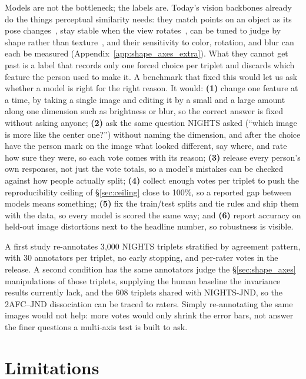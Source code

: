 \documentclass{article}
\begin{document}
Models are not the bottleneck; the labels are. Today's vision backbones already do the things perceptual similarity needs: they match points on an object as its pose changes~\citep{amir2021deepvit,caron2021dino}, stay stable when the view rotates~\citep{naseer2021intriguing,raghu2021vits}, can be tuned to judge by shape rather than texture~\citep{geirhos2018imagenettrained,hermann2020origins}, and their sensitivity to color, rotation, and blur can each be measured (Appendix~\ref{app:shape_axes_extra}). What they cannot get past is a label that records only one forced choice per triplet and discards which feature the person used to make it. A benchmark that fixed this would let us ask whether a model is right for the right reason. It would: \textbf{(1)} change one feature at a time, by taking a single image and editing it by a small and a large amount along one dimension such as brightness or blur, so the correct answer is fixed without asking anyone; \textbf{(2)} ask the same question NIGHTS asked (``which image is more like the center one?'') without naming the dimension, and after the choice have the person mark on the image what looked different, say where, and rate how sure they were, so each vote comes with its reason; \textbf{(3)} release every person's own responses, not just the vote totals, so a model's mistakes can be checked against how people actually split; \textbf{(4)} collect enough votes per triplet to push the reproducibility ceiling of \S\ref{sec:ceiling} close to 100\%, so a reported gap between models means something; \textbf{(5)} fix the train/test splits and tie rules and ship them with the data, so every model is scored the same way; and \textbf{(6)} report accuracy on held-out image distortions next to the headline number, so robustness is visible.

A first study re-annotates 3{,}000 NIGHTS triplets stratified by agreement pattern, with 30 annotators per triplet, no early stopping, and per-rater votes in the release. A second condition has the same annotators judge the \S\ref{sec:shape_axes} manipulations of those triplets, supplying the human baseline the invariance results currently lack, and the 608 triplets shared with NIGHTS-JND, so the 2AFC--JND dissociation can be traced to raters. Simply re-annotating the same images would not help: more votes would only shrink the error bars, not answer the finer questions a multi-axis test is built to ask. 

\section{Limitations}
\label{sec:limitations}
\end{document}
